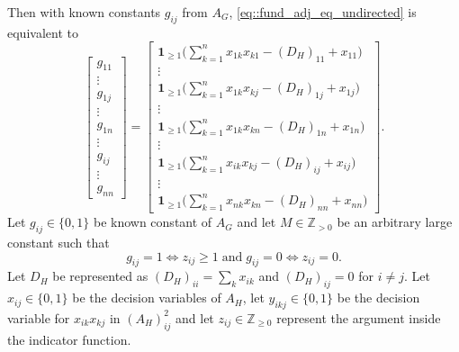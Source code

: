 \documentclass[11pt]{article}
\begin{document}
Then with known constants $g_{ij}$ from $A_G$, \eqref{eq::fund_adj_eq_undirected} is equivalent to 
\begin{equation}  \label{eq::fund_programming_equation}
\begin{bmatrix}
g_{11} \\
\vdots \\
g_{1j} \\
\vdots \\
g_{1n} \\
\vdots \\
g_{ij} \\
\vdots \\
g_{nn}
\end{bmatrix}
=
\begin{bmatrix} \displaystyle
\mathbf{1}_{\geq 1}\!\big(\sum_{k=1}^n x_{1k}x_{k1} - (D_H)_{11} + x_{11} \big) \\
\vdots \\ \displaystyle
\mathbf{1}_{\geq 1}\!\big(\sum_{k=1}^n x_{1k}x_{kj} - (D_H)_{1j} + x_{1j} \big) \\
\vdots \\ \displaystyle
\mathbf{1}_{\geq 1}\!\big(\sum_{k=1}^n x_{1k}x_{kn} - (D_H)_{1n} + x_{1n} \big)\\
\vdots \\ \displaystyle
\mathbf{1}_{\geq 1}\!\big(\sum_{k=1}^n x_{ik}x_{kj} - (D_H)_{ij} + x_{ij} \big)\\
\vdots \\ \displaystyle
\mathbf{1}_{\geq 1}\!\big(\sum_{k=1}^n x_{nk}x_{kn} - (D_H)_{nn} + x_{nn} \big)
\end{bmatrix}.
\end{equation}
Let $g_{ij} \in \{0, 1\}$ be known constant of $A_G$ and let $M \in \mathbb{Z}_{> 0}$ be an arbitrary large constant such that 
\[
g_{ij} = 1 \iff z_{ij} \geq 1 \;\text{and}\; g_{ij} = 0 \iff z_{ij} = 0.
\]
Let $D_H$ be represented as $\displaystyle (D_H)_{ii} = \sum_{k} x_{ik}$ and $(D_H)_{ij} = 0$ for $i \neq j$. Let 
$x_{ij} \in \{0, 1\}$ be the decision variables of $A_H$, let $y_{ikj} \in \{0, 1\}$ be the decision variable for $x_{ik}x_{kj}$ in 
$(A_H)^2_{ij}$ and let $z_{ij} \in \mathbb{Z}_{\geq 0}$ represent the argument inside the indicator function. 
\end{document}
